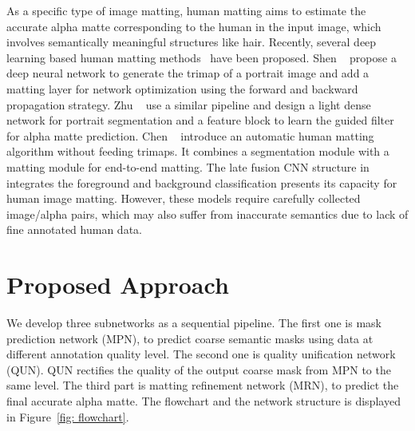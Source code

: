 \documentclass[10pt,twocolumn,letterpaper]{article}
\begin{document}
 As a specific type of image matting, human matting aims to estimate the accurate alpha matte corresponding to the human in the input image, which involves semantically meaningful structures like hair. Recently, several deep learning based human matting methods~\cite{chen2018semantic,shen2016deep,zhu2017fast} have been proposed. Shen \etal~\cite{shen2016deep} propose a deep neural network to generate the trimap of a portrait image and add a matting layer\cite{levin2007closed} for network optimization using the forward and backward propagation strategy. Zhu \etal~\cite{zhu2017fast} use a similar pipeline and design a light dense network for portrait segmentation and a feature block to learn the guided filter~\cite{he2010guided} for alpha matte prediction. Chen \etal~\cite{chen2018semantic} introduce an automatic human matting algorithm without feeding trimaps. It combines a segmentation module with a matting module for end-to-end matting. The late fusion CNN structure in ~\cite{Zhang_2019_CVPR} integrates the foreground and background classification presents its capacity for human image matting. However, these models require carefully collected image/alpha pairs, which may also suffer from inaccurate semantics due to lack of fine annotated human data.


\section{Proposed Approach}


We develop three subnetworks as a sequential pipeline. The first one is mask prediction network (MPN), to predict coarse semantic masks using data at different annotation quality level. The second one is quality unification network (QUN). QUN rectifies the quality of the output coarse mask from MPN to the same level. The third part is matting refinement network (MRN), to predict the final accurate alpha matte. The flowchart and the network structure is displayed in Figure~\ref{fig: flowchart}.
\end{document}
